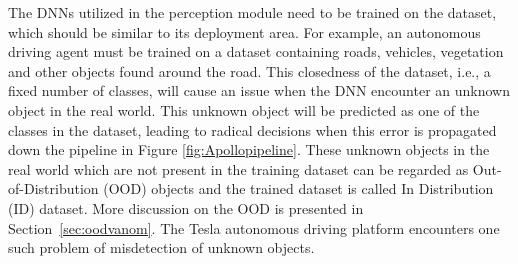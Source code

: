 The DNNs utilized in the perception module need to be trained on the dataset, which should be similar to its deployment area.
For example, an autonomous driving agent must be trained on a dataset containing roads, vehicles, vegetation and other objects found around the road.
This closedness of the dataset, i.e., a fixed number of classes, will cause an issue when the DNN encounter an unknown object in the real world.
This unknown object will be predicted as one of the classes in the dataset, leading to radical decisions when this error is propagated down the pipeline in Figure \ref{fig:Apollopipeline}.
These unknown objects in the real world which are not present in the training dataset can be regarded as Out-of-Distribution (OOD) objects and the trained dataset is called In Distribution (ID) dataset. 
More discussion on the OOD is presented in Section~\ref{sec:oodvanom}.
The Tesla autonomous driving platform encounters one such problem of misdetection of unknown objects.

